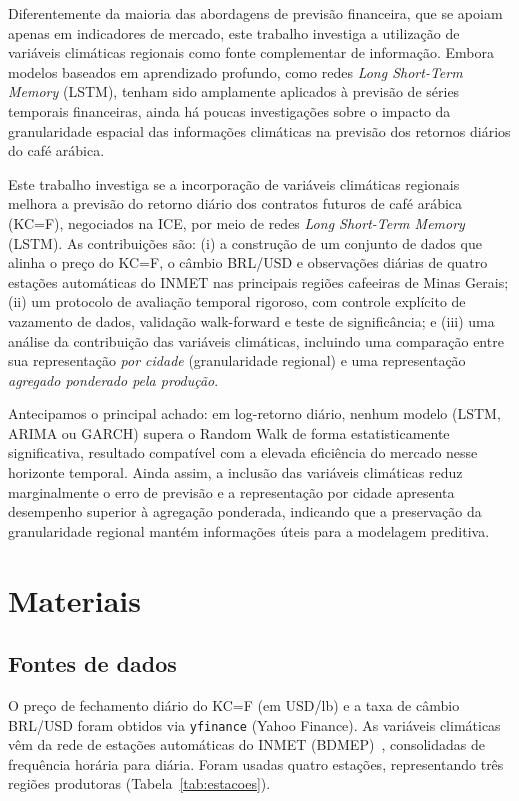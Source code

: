 \documentclass[12pt]{article}
\begin{document}
Diferentemente da maioria das abordagens de previsão financeira, que se apoiam apenas em indicadores de mercado,
este trabalho investiga a utilização de variáveis climáticas regionais como fonte complementar de informação. 
Embora modelos baseados em aprendizado profundo, como redes \emph{Long Short-Term Memory} (LSTM), tenham sido amplamente aplicados
à previsão de séries temporais financeiras, ainda há poucas investigações sobre o impacto da granularidade espacial das informações
climáticas na previsão dos retornos diários do café arábica.

Este trabalho investiga se a incorporação de variáveis climáticas regionais melhora a 
previsão do retorno diário dos contratos futuros de café arábica (KC=F), negociados na ICE,
por meio de redes \emph{Long Short-Term Memory} (LSTM). As contribuições são: (i) a construção de um conjunto
de dados que alinha o preço do KC=F, o câmbio BRL/USD e observações diárias de quatro estações automáticas 
do INMET nas principais regiões cafeeiras de Minas Gerais; (ii) um protocolo de avaliação temporal rigoroso,
com controle explícito de vazamento de dados, validação walk-forward e teste de significância; e (iii) uma análise da
contribuição das variáveis climáticas, incluindo uma comparação entre sua representação \emph{por cidade} (granularidade regional) e 
uma representação \emph{agregado ponderado pela produção}.

Antecipamos o principal achado: em log-retorno diário, nenhum modelo (LSTM, ARIMA ou 
GARCH) supera o Random Walk de forma estatisticamente significativa, resultado compatível 
com a elevada eficiência do mercado nesse horizonte temporal. Ainda assim, a inclusão das variáveis
climáticas reduz marginalmente o erro de previsão e a representação por cidade apresenta desempenho
superior à agregação ponderada, indicando que a preservação da granularidade regional mantém informações 
úteis para a modelagem preditiva.


\section{Materiais}

\subsection{Fontes de dados}

O preço de fechamento diário do KC=F (em USD/lb) e a taxa de câmbio BRL/USD foram
obtidos via \texttt{yfinance} (Yahoo Finance). As variáveis climáticas vêm da rede de
estações automáticas do INMET (BDMEP)~\cite{inmet2025bdmep}, consolidadas de frequência
horária para diária.
Foram usadas quatro estações, representando três regiões produtoras
(Tabela~\ref{tab:estacoes}).
\end{document}
